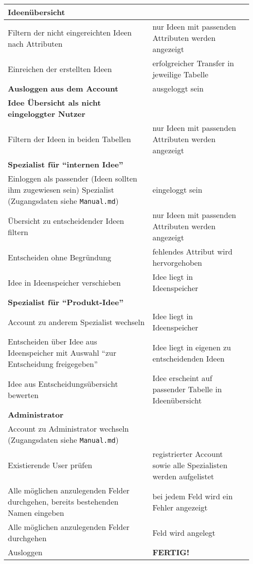 \begin{center}
\begin{longtable}{|p{}|p{}|p{}|}
\textbf{Ideenübersicht} & &\\
\hline
Filtern der nicht eingereichten Ideen nach Attributen & nur Ideen mit passenden Attributen werden angezeigt &\\
\hline 
Einreichen der erstellten Ideen & erfolgreicher Transfer in jeweilige Tabelle &\\
\hline
\hline

\textbf{Ausloggen aus dem Account} & ausgeloggt sein &\\
\hline
\hline

\textbf{Idee Übersicht als nicht eingeloggter Nutzer} & &\\
\hline 
Filtern der Ideen in beiden Tabellen & nur Ideen mit passenden Attributen werden angezeigt &\\
\hline
\hline

\textbf{Spezialist für \enquote{internen Idee}} & &\\
\hline
Einloggen als passender (Ideen sollten ihm zugewiesen sein) Spezialist (Zugangsdaten siehe \texttt{Manual.md})& eingeloggt sein &\\
\hline
Übersicht zu entscheidender Ideen filtern &  nur Ideen mit passenden Attributen werden angezeigt &\\
\hline
Entscheiden ohne Begründung & fehlendes Attribut wird hervorgehoben &\\
\hline
Idee in Ideenspeicher verschieben & Idee liegt in Ideenspeicher &\\
\hline
\hline

\textbf{Spezialist für \enquote{Produkt-Idee}} & &\\
\hline
Account zu anderem Spezialist wechseln & Idee liegt in Ideenspeicher &\\
\hline
Entscheiden über Idee aus Ideenspeicher mit Auswahl  \enquote{zur Entscheidung freigegeben} & Idee liegt in eigenen zu entscheidenden Ideen &\\
\hline
Idee aus Entscheidungsübersicht bewerten & Idee erscheint auf passender Tabelle in Ideenübersicht &\\
\hline
\hline

\textbf{Administrator} & &\\
\hline
Account zu Administrator wechseln (Zugangsdaten siehe \texttt{Manual.md})& &\\
\hline
Existierende User prüfen & registrierter Account sowie alle Spezialisten werden aufgelistet &\\
\hline 
Alle möglichen anzulegenden Felder durchgehen, bereits bestehenden Namen eingeben & bei jedem Feld wird ein Fehler angezeigt &\\
\hline 
Alle möglichen anzulegenden Felder durchgehen & Feld wird angelegt &\\
\hline
Ausloggen & \textbf{FERTIG!} &\\
\hline
\end{longtable}
\end{center}
